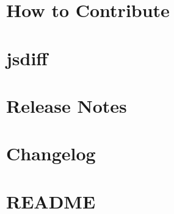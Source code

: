 \documentclass[twoside]{book}
\newcommand{\+}{\discretionary{\mbox{\scriptsize$\hookleftarrow$}}{}{}}
\begin{document}
\chapter{How to Contribute}
\label{md__c___users_vaishnavi_jadhav__desktop__developer_code_mean_stack_example_server_node_modules_diff__c_o_n_t_r_i_b_u_t_i_n_g}

\chapter{jsdiff}
\label{md__c___users_vaishnavi_jadhav__desktop__developer_code_mean_stack_example_server_node_modules_diff__r_e_a_d_m_e}

\chapter{Release Notes}
\label{md__c___users_vaishnavi_jadhav__desktop__developer_code_mean_stack_example_server_node_modules_diff_release_notes}

\chapter{Changelog}
\label{md__c___users_vaishnavi_jadhav__desktop__developer_code_mean_stack_example_server_node_modules_dotenv__c_h_a_n_g_e_l_o_g}

\chapter{README}
\label{md__c___users_vaishnavi_jadhav__desktop__developer_code_mean_stack_example_server_node_modules_dotenv__r_e_a_d_m_e}

\end{document}
